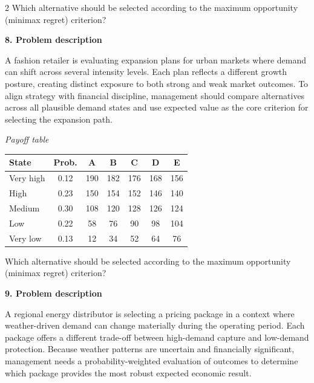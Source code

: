 \documentclass[12pt]{article}
\newcommand{\SubsectionBox}[1]{%
	\noindent\colorbox{gray!30}{%
		\parbox{\linewidth}{\textbf{#1}}%
	}\par\vspace{0.35cm}%
}
\begin{document}
\begin{multicols}{2}
				Which alternative should be selected according to the maximum opportunity (minimax regret) criterion?

		\vspace{0.25cm}
		\SubsectionBox{8. Problem description}\vspace{-0.25cm}
		A fashion retailer is evaluating expansion plans for urban markets where demand can shift across several intensity levels. Each plan reflects a different growth posture, creating distinct exposure to both strong and weak market outcomes. To align strategy with financial discipline, management should compare alternatives across all plausible demand states and use expected value as the core criterion for selecting the expansion path.
		
				\begin{center}
					\textit{Payoff table} \par
					\begin{tabular}{l c c c c c c}
						\toprule
						State & Prob. & A & B & C & D & E \\
						\midrule
						Very high & 0.12 & 190 & 182 & 176 & 168 & 156 \\
						High & 0.23 & 150 & 154 & 152 & 146 & 140 \\
						Medium & 0.30 & 108 & 120 & 128 & 126 & 124 \\
						Low & 0.22 & 58 & 76 & 90 & 98 & 104 \\
						Very low & 0.13 & 12 & 34 & 52 & 64 & 76 \\
						\bottomrule
					\end{tabular}
				\end{center}
		
				Which alternative should be selected according to the maximum opportunity (minimax regret) criterion?

		\vspace{0.25cm}
		\SubsectionBox{9. Problem description}\vspace{-0.25cm}
		A regional energy distributor is selecting a pricing package in a context where weather-driven demand can change materially during the operating period. Each package offers a different trade-off between high-demand capture and low-demand protection. Because weather patterns are uncertain and financially significant, management needs a probability-weighted evaluation of outcomes to determine which package provides the most robust expected economic result.
		

\end{multicols}
\end{document}
